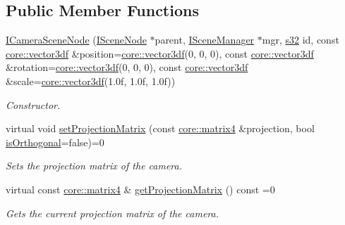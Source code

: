 \subsection*{Public Member Functions}
\begin{DoxyCompactItemize}
\item 
\mbox{\label{classirr_1_1scene_1_1ICameraSceneNode_a80e2a6e96feaf3191129eb6abefebc6f}} 
\hyperlink{classirr_1_1scene_1_1ICameraSceneNode_a80e2a6e96feaf3191129eb6abefebc6f}{I\+Camera\+Scene\+Node} (\hyperlink{classirr_1_1scene_1_1ISceneNode}{I\+Scene\+Node} $\ast$parent, \hyperlink{classirr_1_1scene_1_1ISceneManager}{I\+Scene\+Manager} $\ast$mgr, \hyperlink{namespaceirr_ac66849b7a6ed16e30ebede579f9b47c6}{s32} id, const \hyperlink{namespaceirr_1_1core_ae6e2b2a6c552833ebbd5b7463d03586b}{core\+::vector3df} \&position=\hyperlink{namespaceirr_1_1core_ae6e2b2a6c552833ebbd5b7463d03586b}{core\+::vector3df}(0, 0, 0), const \hyperlink{namespaceirr_1_1core_ae6e2b2a6c552833ebbd5b7463d03586b}{core\+::vector3df} \&rotation=\hyperlink{namespaceirr_1_1core_ae6e2b2a6c552833ebbd5b7463d03586b}{core\+::vector3df}(0, 0, 0), const \hyperlink{namespaceirr_1_1core_ae6e2b2a6c552833ebbd5b7463d03586b}{core\+::vector3df} \&scale=\hyperlink{namespaceirr_1_1core_ae6e2b2a6c552833ebbd5b7463d03586b}{core\+::vector3df}(1.\+0f, 1.\+0f, 1.\+0f))
\begin{DoxyCompactList}\small\item\em Constructor. \end{DoxyCompactList}\item 
virtual void \hyperlink{classirr_1_1scene_1_1ICameraSceneNode_a022415e06070ad77c6053eba64ba62ae}{set\+Projection\+Matrix} (const \hyperlink{namespaceirr_1_1core_a4c9d4e29899535971052810954a14431}{core\+::matrix4} \&projection, bool \hyperlink{classirr_1_1scene_1_1ICameraSceneNode_a5cfd588d836004923f01667543837d6c}{is\+Orthogonal}=false)=0
\begin{DoxyCompactList}\small\item\em Sets the projection matrix of the camera. \end{DoxyCompactList}\item 
virtual const \hyperlink{namespaceirr_1_1core_a4c9d4e29899535971052810954a14431}{core\+::matrix4} \& \hyperlink{classirr_1_1scene_1_1ICameraSceneNode_a80f4a43d24dc31d797a84e0e2f62f1a1}{get\+Projection\+Matrix} () const =0
\begin{DoxyCompactList}\small\item\em Gets the current projection matrix of the camera. \end{DoxyCompactList}\item 

\end{DoxyCompactItemize}
